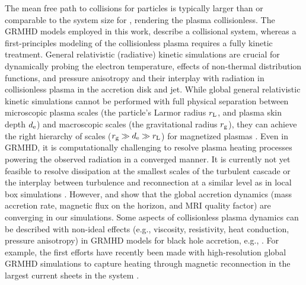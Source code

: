 {The mean free path to collisions for particles is typically larger than or comparable to the system size for \sgra, rendering the plasma collisionless. The GRMHD models employed in this work, describe a collisional system, whereas a first-principles modeling of the collisionless plasma requires a fully kinetic treatment. General relativistic (radiative) kinetic simulations are crucial for dynamically probing the electron temperature, effects of non-thermal distribution functions, and pressure anisotropy and their interplay with radiation in collisionless plasma in the accretion disk and jet. While global general relativistic kinetic simulations cannot be performed with full physical separation between microscopic plasma scales (the particle's Larmor radius $r_{\rm L}$, and plasma skin depth $d_{\rm e}$) and macroscopic scales (the gravitational radius $r_{\rm g}$), they can achieve the right hierarchy of scales ($r_{\rm g} \gg d_{\rm e} \gg r_{\rm L}$) for magnetized plasmas \citep{2018A&A...616A.184L,2018ApJ...863L..31C,2019PhRvL.122c5101P,2020PhRvL.124n5101C,2020ApJ...895..121C,2020ApJ...902...80K,2021A&A...650A.163C,2021PhRvL.127e5101B}. Even in GRMHD, it is computationally challenging to resolve plasma heating processes powering the observed radiation in a converged manner. It is currently not yet feasible to resolve dissipation at the smallest scales of the turbulent cascade or the interplay between turbulence and reconnection at a similar level as in local box simulations \citep{2012ApJ...755...50R,2013ApJ...773..118H,2015PhRvL.114f1101H,2016PhRvL.117w5101K,2017PhRvL.118e5103Z,2018PhRvL.121y5101C,2018ApJ...859..149I,2019PhRvL.122e5101Z,2021ApJ...921...87N,2021arXiv211108188C}. However, \citet{2019ApJS..243...26P} and \citet[in prep.]{Olivares_et_al} show that the global accretion dynamics (mass accretion rate, magnetic flux on the horizon, and MRI quality factor) are converging in our simulations. Some aspects of collisionless plasma dynamics can be described with non-ideal effects (e.g., viscosity, resistivity, heat conduction, pressure anisotropy) in GRMHD models for black hole accretion, e.g.,  \cite{2014MNRAS.440L..41B,2015ApJ...810..162C,2016MNRAS.456.1332F,2017ApJ...837...92C,2017MNRAS.470.2240F,2018ApJ...859...28Q,2019ApJS..244...10R,2019ApJ...882....2V,2020ApJ...900..100R,2021PhRvD.104j3028M,2021arXiv211103689N,2021arXiv211105752M}. For example, the first efforts have recently been made with high-resolution global GRMHD simulations to capture heating through magnetic reconnection in the largest current sheets in the system \citep{2020MNRAS.495.1549N,2020ApJ...900..100R,2021MNRAS.508.1241C,2021arXiv210915115R,2021arXiv211103689N}.}

